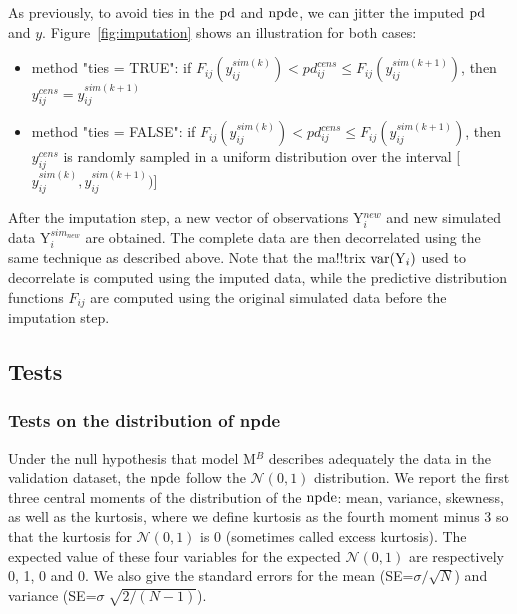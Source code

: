 \bigskip As previously, to avoid ties in the ${\rm pd}$ and ${\rm npde}$, we can jitter the imputed ${\rm pd}$ and $y$. 
Figure~\ref{fig:imputation} shows an illustration for both cases: \begin{itemize} \item method {\sf "ties = TRUE"}: 
if $F_{ij}(y_{ij}^{sim(k)}) < pd_{ij}^{cens}\leq F_{ij}(y_{ij}^{sim(k+1)})$, then $y_{ij}^{cens} = 
y_{ij}^{sim(k+1)}$ \item method {\sf "ties = FALSE"}: if $F_{ij}(y_{ij}^{sim(k)}) < pd_{ij}^{cens}\leq 
F_{ij}(y_{ij}^{sim(k+1)})$, then $y_{ij}^{cens}$ is randomly sampled in a uniform distribution over the interval 
[$y_{ij}^{sim(k)},y_{ij}^{sim(k+1)})$] \end{itemize}

After the imputation step, a new vector of observations Y$_{i}^{new}$ and new simulated data Y$_{i}^{sim_{new}}$ 
are obtained. The complete data are then decorrelated using the same technique as described above. Note that the 
ma!!trix $\hbox{var}({\rm Y}_i)$ used to decorrelate is computed using the imputed data, while the predictive distribution 
functions $F_{ij}$ are computed using the original simulated data before the imputation step.

\subsection{Tests}

\subsubsection{Tests on the distribution of npde} \hskip 18pt Under the null hypothesis that model M$^B$ describes 
adequately the data in the validation dataset, the ${\rm npde}$ follow the $\mathcal{N}(0, 1)$ distribution. We report 
the first three central moments of the distribution of the ${\rm npde}$: mean, variance, skewness, as well as the 
kurtosis, where we define kurtosis as the fourth moment minus 3 so that the kurtosis for $\mathcal{N}(0,1)$ is 0 
(sometimes called excess kurtosis). The expected value of these four variables for the expected $\mathcal{N}(0,1)$ 
are respectively 0, 1, 0 and 0. We also give the standard errors for the mean (SE=$\sigma/\sqrt{N}$) and variance 
(SE=$\sigma \; \sqrt{2/(N-1)}$).

